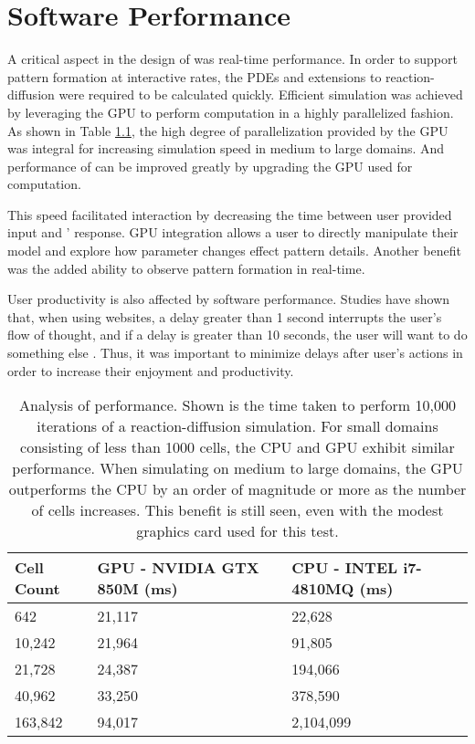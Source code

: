 \chapter{Software Performance}
A critical aspect in the design of \ProgramName{} was real-time performance. In order to support pattern formation at interactive rates, the PDEs and extensions to reaction-diffusion were required to be calculated quickly. Efficient simulation was achieved by leveraging the GPU to perform computation in a highly parallelized fashion. As shown in Table \ref{tab:perf}, the high degree of parallelization provided by the GPU was integral for increasing simulation speed in medium to large domains.   And performance of \ProgramName{} can be improved greatly by upgrading the GPU used for computation.

This speed facilitated interaction by decreasing the time between user provided input and \ProgramName{}' response. GPU integration allows a user to directly manipulate their model and explore how parameter changes effect pattern details. Another benefit was the added ability to observe pattern formation in real-time.

User productivity is also affected by software performance. Studies have shown that, when using websites, a delay greater than 1 second interrupts the user's flow of thought, and if a delay is greater than 10 seconds, the user will want to do something else \citep{nielsen1994}. Thus, it was important to minimize delays after user's actions in order to increase their enjoyment and productivity.

\begin{table}[p]
	\centering
	\begin{tabular}{lll} \hline
	Cell Count & GPU - NVIDIA GTX 850M (ms)    & CPU - INTEL i7-4810MQ (ms)\\ \hline
	642      & 21,117 & 22,628    \\
	10,242   & 21,964 & 91,805    \\
	21,728   & 24,387 & 194,066   \\
	40,962   & 33,250 & 378,590   \\
	163,842  & 94,017 & 2,104,099 \\ \hline 
	\end{tabular}
	\caption[Analysis of \ProgramName{} performance]{Analysis of \ProgramName{} performance. Shown is the time taken to perform 10,000 iterations of a reaction-diffusion simulation. For small domains consisting of less than 1000 cells, the CPU and GPU exhibit similar performance. When simulating on medium to large domains, the GPU outperforms the CPU by an order of magnitude or more as the number of cells increases. This benefit is still seen, even with the modest graphics card used for this test.}
	\label{tab:perf}
\end{table}

